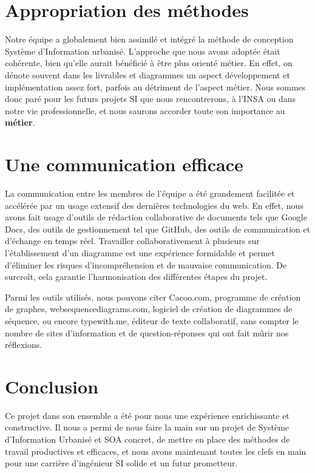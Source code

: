 \section{Appropriation des méthodes}

Notre équipe a globalement bien assimilé et intégré la méthode de conception Système d'Information urbanisé. L'approche que nous avons adoptée était cohérente, bien qu'elle aurait bénéficié à être plus orienté métier. En effet, on dénote souvent dans les livrables et diagrammes un aspect développement et implémentation assez fort, parfois au détriment de l'aspect métier. Nous sommes donc paré pour les futurs projets SI que nous rencontrerons, à l'INSA ou dans notre vie professionnelle, et nous saurons accorder toute son importance au \textbf{métier}.

\section{Une communication efficace}

La communication entre les membres de l'équipe a été grandement facilitée et accélérée par un usage extensif des dernières technologies du web. En effet, nous avons fait usage d'outils de rédaction collaborative de documents tels que Google Docs, des outils de gestionnement tel que GitHub, des outils de communication et d'échange en temps réel. Travailler collaborativement à plusieurs sur l'établissement d'un diagramme est une expérience formidable et permet d'éliminer les risques d'incompréhension et de mauvaise communication. De surcroît, cela garantie l'harmonisation des différentes étapes du projet.

Parmi les outils utilisés, nous pouvons citer Cacoo.com, programme de création de graphes, websequencediagrams.com, logiciel de création de diagrammes de séquence, ou encore typewith.me, éditeur de texte collaboratif, sans compter le nombre de sites d'information et de question-réponses qui ont fait mûrir nos réflexions.

\section{Conclusion}

Ce projet dans son ensemble a été pour nous une expérience enrichissante et constructive. Il nous a permi de nous faire la main sur un projet de Système d'Information Urbanisé et SOA concret, de mettre en place des méthodes de travail productives et efficaces, et nous avons maintenant toutes les clefs en main pour une carrière d'ingénieur SI solide et un futur prometteur.
